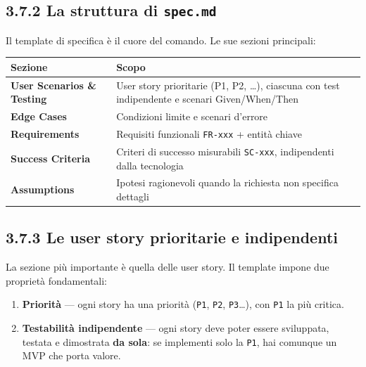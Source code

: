 \documentclass[
  italian,
  10pt,
]{book}
\newcounter{none} %
\providecommand{\tightlist}{%
  \setlength{\itemsep}{0pt}\setlength{\parskip}{0pt}}
\begin{document}
\subsection{\texorpdfstring{3.7.2 La struttura di
\texttt{spec.md}}{3.7.2 La struttura di spec.md}}\label{la-struttura-di-spec.md}

Il template di specifica è il cuore del comando. Le sue sezioni
principali:

{\def\LTcaptype{none} %
\begin{longtable}[]{@{}
  >{\raggedright\arraybackslash}p{}
  >{\raggedright\arraybackslash}p{}@{}}
\toprule\noalign{}
\begin{minipage}[b]{\linewidth}\raggedright
Sezione
\end{minipage} & \begin{minipage}[b]{\linewidth}\raggedright
Scopo
\end{minipage} \\
\midrule\noalign{}
\endhead
\bottomrule\noalign{}
\endlastfoot
\textbf{User Scenarios \& Testing} & User story prioritarie (P1, P2,
\ldots), ciascuna con test indipendente e scenari Given/When/Then \\
\textbf{Edge Cases} & Condizioni limite e scenari d'errore \\
\textbf{Requirements} & Requisiti funzionali \texttt{FR-xxx} + entità
chiave \\
\textbf{Success Criteria} & Criteri di successo misurabili
\texttt{SC-xxx}, indipendenti dalla tecnologia \\
\textbf{Assumptions} & Ipotesi ragionevoli quando la richiesta non
specifica dettagli \\
\end{longtable}
}

\subsection{3.7.3 Le user story prioritarie e
indipendenti}\label{le-user-story-prioritarie-e-indipendenti}

La sezione più importante è quella delle user story. Il template impone
due proprietà fondamentali:

\begin{enumerate}
\def\labelenumi{\arabic{enumi}.}
\tightlist
\item
  \textbf{Priorità} --- ogni story ha una priorità (\texttt{P1},
  \texttt{P2}, \texttt{P3}\ldots), con \texttt{P1} la più critica.
\item
  \textbf{Testabilità indipendente} --- ogni story deve poter essere
  sviluppata, testata e dimostrata \textbf{da sola}: se implementi solo
  la \texttt{P1}, hai comunque un MVP che porta valore.
\end{enumerate}
\end{document}
